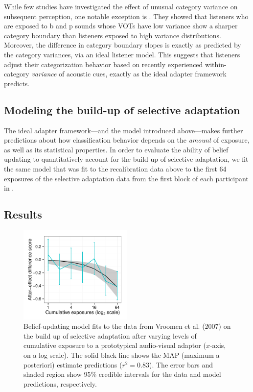 While few studies have investigated the effect of unusual category variance on subsequent perception, one notable exception is .  They showed that listeners who are exposed to \ph b and \ph p sounds whose VOTs have low variance show a sharper category boundary than listeners exposed to high variance distributions.  Moreover, the difference in category boundary slopes is exactly as predicted by the category variances, via an ideal listener model.  This suggests that listeners adjust their categorization behavior based on recently experienced within-category \emph{variance} of acoustic cues, exactly as the ideal adapter framework predicts.

\subsection{Modeling the build-up of selective adaptation}
\label{sec:methods-results}

The ideal adapter framework---and the model introduced above---makes further predictions about how classification behavior depends on the \emph{amount} of exposure, as well as its statistical properties.  In order to evaluate the ability of belief updating to quantitatively account for the build up of selective adaptation, we fit the same model that was fit to the recalibration data above to the first 64 exposures of the selective adaptation data from the first block of each participant in .

\subsection{Results}
\label{sec:results-discussion}

\begin{figure}[htb]
  \centering
  \includegraphics[width=0.5\textwidth]{figure/vroomen-selad-ae-fits-first-64.pdf}
  \caption{Belief-updating model fits to the data from Vroomen et al. (2007) on the build up of selective adaptation after varying levels of cumulative exposure to a prototypical audio-visual adaptor ($x$-axis, on a log scale).  The solid black line shows the MAP (maximum a posteriori) estimate predictions ($r^2=0.83$). The error bars and shaded region show 95\% credible intervals for the data and model predictions, respectively. }
  \label{fig:selad-buildup-preds}
\end{figure}

